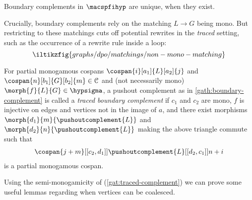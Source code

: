 \begin{proposition}\label{prop:boundary-complement-unique}
    Boundary complements in \(\macspfihyp\) are unique, when they exist.
\end{proposition}

\noindent
Crucially, boundary complements rely on the matching \(L \to G\) being mono.
But restricting to these matchings cuts off potential rewrites in the
\emph{traced} setting, such as the occurrence of a rewrite rule inside a loop:
\[
    \iltikzfig{graphs/dpo/matchings/non-mono-matching}
\]

\begin{definition}
    For partial monogamous cospans \(
        \cospan{i}[a_1]{L}[a_2]{j}
    \) and \(
        \cospan{n}[b_1]{G}[b_2]{m} \in \mathcal{C}
    \) and (not necessarily mono) \(
        \morph{f}{L}{G} \in \hypsigma
    \), a pushout complement as in \cref{gath:boundary-complement}
    is called a \emph{traced boundary complement} if \(c_1\) and \(c_2\) are
    mono, \(f\) is injective on edges and vertices not in the image of \(a\),
    and there exist morphisms \(
        \morph{d_1}{m}{\pushoutcomplement{L}}
    \) and \(
        \morph{d_2}{n}{\pushoutcomplement{L}}
    \) making the above triangle commute such that
    \begin{gather}
        \cospan{j+m}[[c_2,d_1]]{\pushoutcomplement{L}}[[d_2,c_1]]{{n+i}}
        \label{gat:traced-complement}
    \end{gather} is a partial monogamous cospan.
\end{definition}

\noindent
Using the semi-monogamicity of (\ref{gat:traced-complement}) we can prove some
useful lemmas regarding when vertices can be coalesced.

